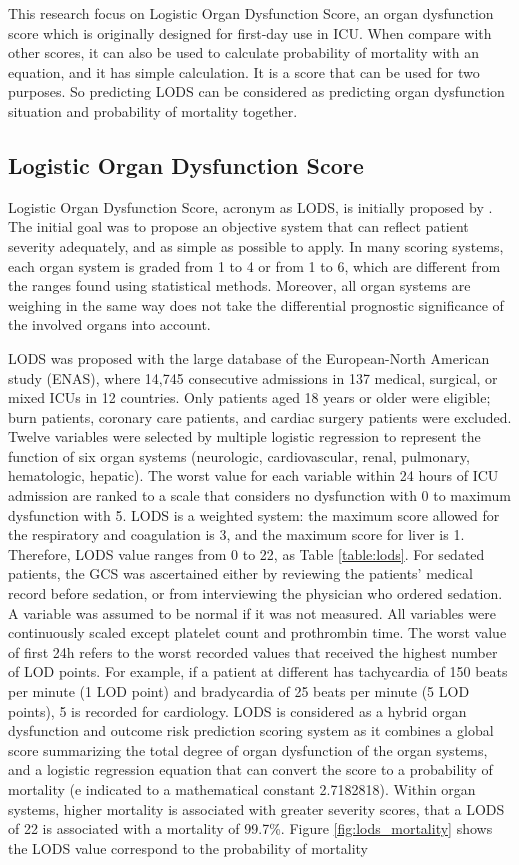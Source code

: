\documentclass[12pt,a4paper,english
]{tunithesis}
\begin{document}
This research focus on Logistic Organ Dysfunction Score, an organ dysfunction score which is originally designed for first-day use in ICU. When compare with other scores, it can also be used to calculate probability of mortality with an equation, and it has simple calculation. It is a score that can be used for two purposes. So predicting LODS can be considered as predicting organ dysfunction situation and probability of mortality together. 

\subsection{Logistic Organ Dysfunction Score}
Logistic Organ Dysfunction Score, acronym as LODS, is initially proposed by \textcite{legall96}. The initial goal was to propose an objective system that can reflect  patient severity adequately, and as simple as possible to apply.  In many scoring systems, each organ system is graded from 1 to 4 or from 1 to 6, which are different from the ranges found using statistical methods. Moreover, all organ systems are weighing in the same way does not take the differential prognostic significance of the involved organs into account. 

LODS was proposed with the large database of the European-North American study (ENAS), where 14,745 consecutive admissions in 137 medical, surgical, or mixed ICUs in 12 countries. Only patients aged 18 years or older were eligible; burn patients, coronary care patients, and cardiac surgery patients were excluded. Twelve variables were selected by multiple logistic regression to represent the function of six organ systems (neurologic, cardiovascular, renal, pulmonary, hematologic, hepatic). The worst value for each variable within 24 hours of ICU admission are ranked to a scale that considers no dysfunction with 0 to maximum dysfunction with 5. LODS is a weighted system: the maximum score allowed for the respiratory and coagulation is 3, and the maximum score for liver is 1. Therefore, LODS value ranges from 0 to 22, as Table \ref{table:lods}. For sedated patients, the GCS was ascertained either by reviewing the patients' medical record before sedation, or from interviewing the physician who ordered sedation. A variable was assumed to be normal if it was not measured. All variables were continuously scaled except platelet count and prothrombin time. The worst value of first 24h refers to the worst recorded values that received the highest number of LOD points. For example, if a patient at different has tachycardia of 150 beats per minute (1 LOD point) and bradycardia of 25 beats per minute (5 LOD points), 5 is recorded for cardiology. LODS is considered as a hybrid organ dysfunction and outcome risk prediction scoring system as it combines a global score summarizing the total degree of organ dysfunction of the organ systems, and a logistic regression equation that can convert the score to a probability of mortality (e indicated to a mathematical constant 2.7182818). Within organ systems, higher mortality is associated with greater severity scores, that a LODS of 22 is associated with a mortality of 99.7\%. \parencite{Tiffany21, Vincent2010, sekulic2015} Figure \ref{fig:lods_mortality} shows the LODS value correspond to the probability of mortality
\end{document}
